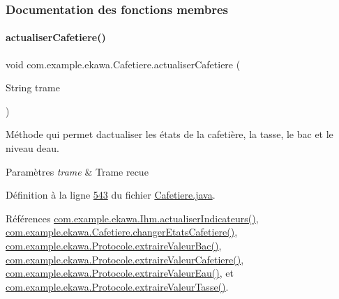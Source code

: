 \subsubsection{Documentation des fonctions membres}
\mbox{\label{classcom_1_1example_1_1ekawa_1_1_cafetiere_a6485aa7504eeb5c3c09accab52bb3ad1}} 
\paragraph{\texorpdfstring{actualiser\+Cafetiere()}{actualiserCafetiere()}}
{\footnotesize\ttfamily void com.\+example.\+ekawa.\+Cafetiere.\+actualiser\+Cafetiere (\begin{DoxyParamCaption}\item[{String}]{trame }\end{DoxyParamCaption})\hspace{0.3cm}{\ttfamily [private]}}



Méthode qui permet d\textquotesingle{}actualiser les états de la cafetière, la tasse, le bac et le niveau d\textquotesingle{}eau. 


\begin{DoxyParams}{Paramètres}
{\em trame} & Trame recue \\
\hline
\end{DoxyParams}


Définition à la ligne \hyperlink{_cafetiere_8java_source_l00543}{543} du fichier \hyperlink{_cafetiere_8java_source}{Cafetiere.\+java}.



Références \hyperlink{_ihm_8java_source_l00855}{com.\+example.\+ekawa.\+Ihm.\+actualiser\+Indicateurs()}, \hyperlink{_cafetiere_8java_source_l00636}{com.\+example.\+ekawa.\+Cafetiere.\+changer\+Etats\+Cafetiere()}, \hyperlink{_protocole_8java_source_l00277}{com.\+example.\+ekawa.\+Protocole.\+extraire\+Valeur\+Bac()}, \hyperlink{_protocole_8java_source_l00233}{com.\+example.\+ekawa.\+Protocole.\+extraire\+Valeur\+Cafetiere()}, \hyperlink{_protocole_8java_source_l00299}{com.\+example.\+ekawa.\+Protocole.\+extraire\+Valeur\+Eau()}, et \hyperlink{_protocole_8java_source_l00255}{com.\+example.\+ekawa.\+Protocole.\+extraire\+Valeur\+Tasse()}.



